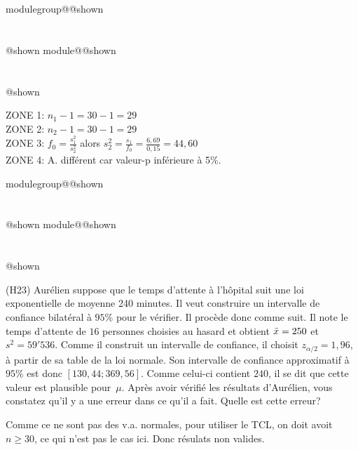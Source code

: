 \documentclass{Evaluation}
\makeatletter
\newcommand{\currentmodulekey}{}
\newcommand{\currentmoduletitle}{}
\newcommand{\currentgroupkey}{}
\newcommand{\currentgrouptitle}{}
\newcommand{\showmoduleifneeded}{%
  \ifx\currentgroupkey\empty\else
    \expandafter\ifx\csname modulegroup@\currentgroupkey @shown\endcsname\relax
      \section*{\currentgrouptitle}%
      \expandafter\gdef\csname modulegroup@\currentgroupkey @shown\endcsname{1}%
    \fi
  \fi
  \expandafter\ifx\csname module@\currentmodulekey @shown\endcsname\relax
    \section*{\currentmoduletitle}%
    \expandafter\gdef\csname module@\currentmodulekey @shown\endcsname{1}%
  \fi
}
\newenvironment{A22}{\showmoduleifneeded}{}
\newenvironment{H23}{\showmoduleifneeded}{}
\makeatother
\begin{document}
\begin{questions}
\begin{A22}
\begin{parts}

\end{parts}

	\begin{solution}
		ZONE 1:  $n_1-1=30-1=29$\\
		ZONE 2:  $n_2-1=30-1=29$\\
		ZONE 3: $\displaystyle f_0= \frac{s_1^2}{s_2^2}$ alors
		$ \displaystyle s_2^2 = \frac{s_1}{f_0}
		= \frac{6,69}{0,15}
		= 44,60	$ \\
		ZONE 4: A. différent car valeur-p inférieure à 5\%.\\
	\end{solution}

\end{A22}

\begin{H23}
\question
(H23)  Aurélien suppose que le temps d'attente à l'hôpital suit une loi exponentielle de moyenne 240 minutes. 
Il veut construire un intervalle de confiance bilatéral à $95\%$ pour le vérifier.
Il procède donc comme suit. 
Il note le temps d'attente de $16$ personnes choisies au hasard et obtient $\Bar{x}=250$ et $s^2=59'536$.
Comme il construit un intervalle de confiance, il choisit $z_{\alpha/2}=1,96$, à partir de sa table de la loi normale.
Son intervalle de confiance approximatif à $95\%$ est donc $[130,44;369,56]$.
Comme celui-ci contient $240$, il se dit que cette valeur est plausible pour~$\mu$. 
Après avoir vérifié les résultats d'Aurélien, vous constatez qu'il y a une erreur dans ce qu'il a fait. 
Quelle est cette erreur?
\begin{solution}
    Comme ce ne sont pas des v.a. normales, pour utiliser le TCL, on doit avoit $n\geq30$, ce qui n'est pas le cas ici. Donc résulats non valides.
\end{solution}
\vspace{4cm}
\end{H23}


\end{questions}
\end{document}
